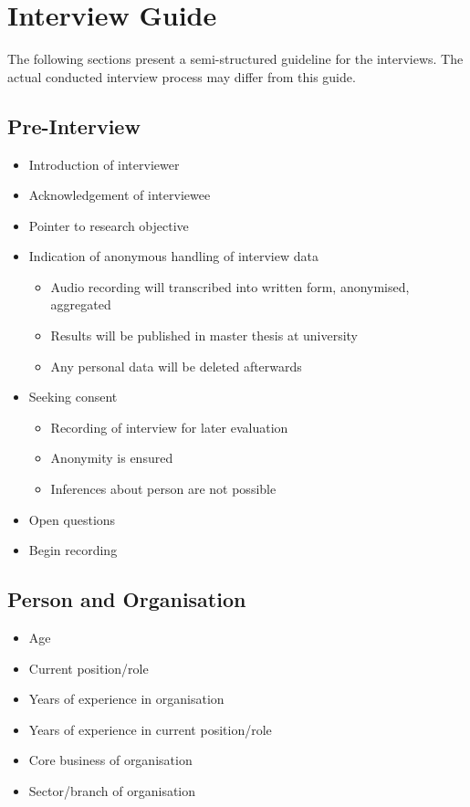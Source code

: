 \section{Interview Guide}

The following sections present a semi-structured guideline for the interviews.
The actual conducted interview process may differ from this guide.

\subsection{Pre-Interview}

\begin{itemize}
	\item Introduction of interviewer
	\item Acknowledgement of interviewee
	\item Pointer to research objective
	\item Indication of anonymous handling of interview data
	\begin{itemize}
		\item Audio recording will transcribed into written form, anonymised, aggregated
		\item Results will be published in master thesis at university
		\item Any personal data will be deleted afterwards
	\end{itemize}
	\item Seeking consent
	\begin{itemize}
		\item Recording of interview for later evaluation
		\item Anonymity is ensured
		\item Inferences about person are not possible
	\end{itemize}
	\item Open questions
	\item Begin recording
\end{itemize}

\subsection{Person and Organisation}

\begin{itemize}
	\item Age
	\item Current position/role
	\item Years of experience in organisation
	\item Years of experience in current position/role
	\item Core business of organisation
	\item Sector/branch of organisation
\end{itemize}

